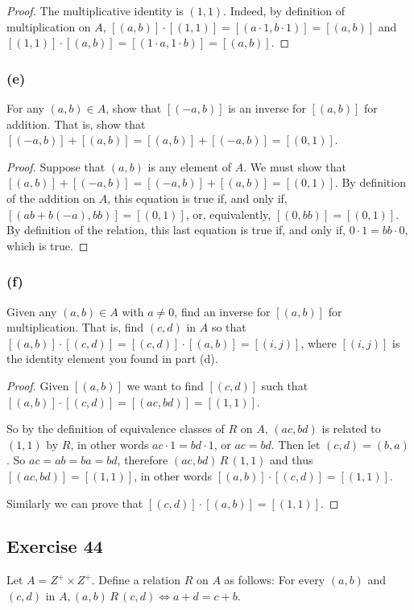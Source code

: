 \documentclass[14pt]{extarticle}
\begin{document}
\begin{proof}
The multiplicative identity is \((1,1)\). Indeed, by definition of multiplication on \(A\), \([(a, b)] \cdot 
[(1, 1)] = [(a \cdot 1, b \cdot 1)] = [(a,b)]\) and \([(1, 1)] \cdot [(a, b)] = [(1 \cdot a, 1 \cdot b)] = [(a,b)]\).
\end{proof}

\subsubsection{(e)}
For any \((a, b) \in A\), show that \([(-a, b)]\) is an inverse for \([(a, b)]\) for addition. That is, show that 
\([(-a, b)] + [(a, b)] = [(a, b)] + [(-a, b)] = [(0, 1)]\).

\begin{proof}
Suppose that \((a, b)\) is any element of \(A\). We must show that \([(a, b)] + [(-a, b)] = [(-a, b)] + [(a, b)] = 
[(0, 1)]\). By definition of the addition on \(A\), this equation is true if, and only if, \([(ab + b(-a), bb)] = 
[(0, 1)]\), or, equivalently, \([(0, bb)] = [(0, 1)]\). By definition of the relation, this last equation is true if, 
and only if, \(0 \cdot 1 = bb \cdot 0\), which is true.
\end{proof}

\subsubsection{(f)}
Given any \((a, b) \in A\) with \(a \neq 0\), find an inverse for \([(a, b)]\) for multiplication. That is, find 
\((c, d)\) in \(A\) so that \([(a, b)] \cdot [(c, d)] = [(c, d)] \cdot [(a, b)] = [(i, j)]\), where \([(i, j)]\) is 
the identity element you found in part (d).

\begin{proof}
Given \([(a,b)]\) we want to find \([(c,d)]\) such that \([(a,b)] \cdot [(c,d)] = [(ac,bd)] = [(1,1)]\). 

So by the definition of equivalence classes of $R$ on $A$, \((ac,bd)\) is related to \((1,1)\) by $R$, in other words 
\(ac \cdot 1 = bd \cdot 1\), or \(ac = bd\). Then let \((c,d) = (b,a)\). So \(ac = ab = ba = bd\), therefore 
\((ac,bd) \,R\, (1,1)\) and thus \([(ac,bd)] = [(1,1)]\), in other words \([(a,b)] \cdot [(c,d)] = [(1,1)]\).

Similarly we can prove that \([(c,d)] \cdot [(a,b)] = [(1,1)]\).
\end{proof}

\subsection{Exercise 44}
Let \(A = Z^+ \times Z^+\). Define a relation \(R\) on \(A\) as follows: For every \((a, b)\) and \((c, d)\) in 
\(A, (a, b) \,R\, (c, d) \iff a + d = c + b\).
\end{document}

